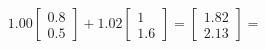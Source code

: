\documentclass[preview]{standalone}
\begin{document}
\begin{align*}
1.00 \begin{bmatrix} 0.8 \\ 0.5 \end{bmatrix} + 1.02 \begin{bmatrix} 1 \\ 1.6 \end{bmatrix} = \begin{bmatrix} 1.82 \\ 2.13 \end{bmatrix} =
\end{align*}
\end{document}
